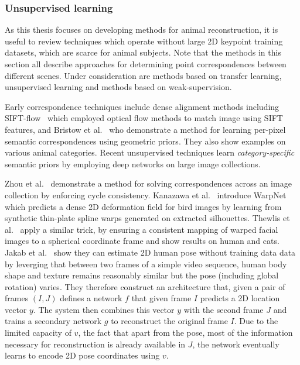 \subsubsection{Unsupervised learning}

As this thesis focuses on developing methods for animal reconstruction, it is useful to review techniques which operate without large 2D keypoint training datasets, which are scarce for animal subjects. Note that the methods in this section all describe approaches for determining point correspondences between different scenes. Under consideration are methods based on transfer learning, unsupervised learning and methods based on weak-supervision. 

Early correspondence techniques include dense alignment methods including SIFT-flow~\cite{siftflow} which employed optical flow methods to match image using SIFT features, and Bristow et al.~\cite{Bristow2015DenseSC} who demonstrate a method for learning per-pixel semantic correspondences using geometric priors. They also show examples on various animal categories. Recent unsupervised techniques learn \emph{category-specific} semantic priors by employing deep networks on large image collections.

Zhou et al.~\cite{flowweb-efros} demonstrate a method for solving correspondences across an image collection by enforcing cycle consistency. Kanazawa et al.~\cite{kanazawa2016warpnet} introduce WarpNet which predicts a dense 2D deformation field for bird images by learning from synthetic thin-plate spline warps generated on extracted silhouettes. Thewlis et al.~\cite{thewlis-unsup-sphere} apply a similar trick, by ensuring a consistent mapping of warped facial images to a spherical coordinate frame and show results on human and cats. Jakab et al.~\cite{unsup-articulated-objects} show they can estimate 2D human pose without training data data by leverging that between two frames of a simple video sequence, human body shape and texture remains reasonably similar but the pose (including global rotation) varies. They therefore construct an architecture that, given a pair of frames $(I, J)$ defines a network $f$ that given frame $I$ predicts a 2D location vector $y$. The system then combines this vector $y$ with the second frame $J$ and trains a secondary network $g$ to reconstruct the original frame $I$. Due to the limited capacity of $v$, the fact that apart from the pose, most of the information necessary for reconstruction is already available in $J$, the network eventually learns to encode 2D pose coordinates using $v$.

